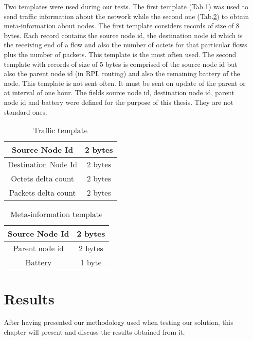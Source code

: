 Two templates were used during our tests. The first template (Tab.\ref{table:traffic_template}) was used to send traffic information about the network while the second one (Tab.\ref{table:meta_info_template}) to obtain meta-information about nodes. The first template considers records of size of 8 bytes. Each record contains the source node id, the destination node id which is the receiving end of a flow and also the number of octets for that particular flows plus the number of packets. This template is the most often used. The second template with records of size of 5 bytes is comprised of the source node id but also the parent node id (in RPL routing) and also the remaining battery of the node. This template is not sent often. It must be sent on update of the parent or at interval of one hour. The fields source node id, destination node id, parent node id and battery were defined for the purpose of this thesis. They are not standard ones.

\begin{table}
  \centering
  \begin{tabular}{|c|c|}
    \hline
    Source Node Id & 2 bytes \\
    \hline
    Destination Node Id & 2 bytes \\
    \hline
    Octets delta count & 2 bytes \\
    \hline
    Packets delta count & 2 bytes \\
    \hline
  \end{tabular}
  \caption{Traffic template}
  \label{table:traffic_template}
\end{table}

\begin{table}
  \centering
  \begin{tabular}{|c|c|}
    \hline
    Source Node Id & 2 bytes \\
    \hline
    Parent node id & 2 bytes \\
    \hline
    Battery & 1 byte \\
    \hline
  \end{tabular}
  \caption{Meta-information template}
  \label{table:meta_info_template}
\end{table}

\chapter{Results}

After having presented our methodology used when testing our solution, this chapter will present and discuss the results obtained from it.
